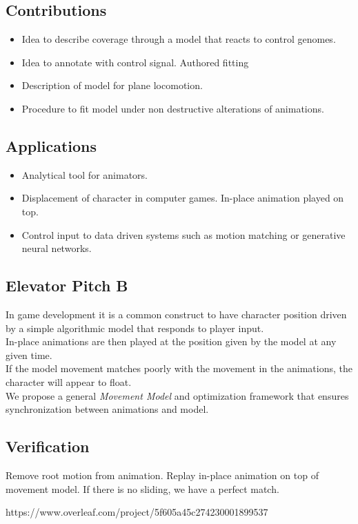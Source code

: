 \documentclass[format=acmtog]{acmart}
\begin{document}
\subsection{Contributions}
\begin{itemize}
    \item Idea to describe coverage through a model that reacts to control genomes.
    \item Idea to annotate with control signal. Authored fitting
    \item Description of model for plane locomotion.
    \item Procedure to fit model under non destructive alterations of animations.
\end{itemize}
\subsection{Applications}
\begin{itemize}
    \item Analytical tool for animators.
    \item Displacement of character in computer games. In-place animation played on top.
    \item Control input to data driven systems such as motion matching or generative neural networks.
\end{itemize}

\subsection{Elevator Pitch B}
In game development it is a common construct to have character position driven by a simple algorithmic model that responds to player input.
\\ 
In-place animations are then played at the position given by the model at any given time.
\\
If the model movement matches poorly with the movement in the animations, the character will appear to float.
\\
We propose a general \textit{Movement Model} and optimization framework that ensures synchronization between animations and model. 

\subsection{Verification}
Remove root motion from animation. Replay in-place animation on top of movement model. If there is no sliding, we have a perfect match.









https://www.overleaf.com/project/5f605a45c274230001899537





{}

\end{document}
